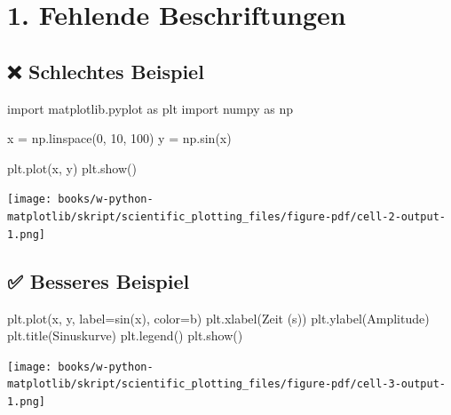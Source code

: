 \documentclass[
  letterpaper,
  DIV=11,
  numbers=noendperiod]{scrreprt}
\newenvironment{Shaded}{\begin{snugshade}}{\end{snugshade}}
\newcommand{\DecValTok}[1]{\textcolor[rgb]{0.68,0.00,0.00}{#1}}
\newcommand{\ImportTok}[1]{\textcolor[rgb]{0.00,0.46,0.62}{#1}}
\newcommand{\NormalTok}[1]{\textcolor[rgb]{0.00,0.23,0.31}{#1}}
\newcommand{\OperatorTok}[1]{\textcolor[rgb]{0.37,0.37,0.37}{#1}}
\newcommand{\StringTok}[1]{\textcolor[rgb]{0.13,0.47,0.30}{#1}}
\begin{document}
\section{1. Fehlende Beschriftungen}\label{fehlende-beschriftungen}

\subsection{❌ Schlechtes Beispiel}\label{schlechtes-beispiel}

\begin{Shaded}
\begin{Highlighting}[]
\ImportTok{import}\NormalTok{ matplotlib.pyplot }\ImportTok{as}\NormalTok{ plt}
\ImportTok{import}\NormalTok{ numpy }\ImportTok{as}\NormalTok{ np}

\NormalTok{x }\OperatorTok{=}\NormalTok{ np.linspace(}\DecValTok{0}\NormalTok{, }\DecValTok{10}\NormalTok{, }\DecValTok{100}\NormalTok{)}
\NormalTok{y }\OperatorTok{=}\NormalTok{ np.sin(x)}

\NormalTok{plt.plot(x, y)}
\NormalTok{plt.show()}
\end{Highlighting}
\end{Shaded}

\texttt{[image: books/w-python-matplotlib/skript/scientific\_plotting\_files/figure-pdf/cell-2-output-1.png]}

\subsection{✅ Besseres Beispiel}\label{besseres-beispiel}

\begin{Shaded}
\begin{Highlighting}[]
\NormalTok{plt.plot(x, y, label}\OperatorTok{=}\StringTok{\textquotesingle{}sin(x)\textquotesingle{}}\NormalTok{, color}\OperatorTok{=}\StringTok{\textquotesingle{}b\textquotesingle{}}\NormalTok{)}
\NormalTok{plt.xlabel(}\StringTok{\textquotesingle{}Zeit (s)\textquotesingle{}}\NormalTok{)}
\NormalTok{plt.ylabel(}\StringTok{\textquotesingle{}Amplitude\textquotesingle{}}\NormalTok{)}
\NormalTok{plt.title(}\StringTok{\textquotesingle{}Sinuskurve\textquotesingle{}}\NormalTok{)}
\NormalTok{plt.legend()}
\NormalTok{plt.show()}
\end{Highlighting}
\end{Shaded}

\texttt{[image: books/w-python-matplotlib/skript/scientific\_plotting\_files/figure-pdf/cell-3-output-1.png]}
\end{document}
